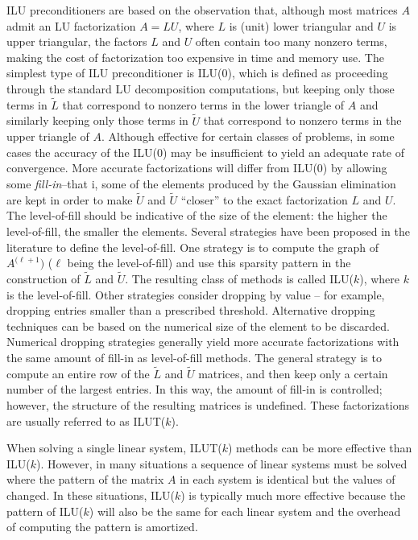 ILU preconditioners are based on the observation that, although most matrices
$A$ admit an LU factorization $A=LU$, where $L$ is (unit) lower triangular and
$U$ is upper triangular, the factors $L$ and $U$ often contain too many
nonzero terms, making the cost of factorization too expensive in time and
memory use.  The simplest type of ILU preconditioner is ILU(0), which is
defined as proceeding through the standard LU decomposition computations, but
keeping only those terms in $\tilde{L}$ that correspond to nonzero terms in
the lower triangle of $A$ and similarly keeping only those terms in
$\tilde{U}$ that correspond to nonzero terms in the upper triangle of $A$.
Although effective for certain classes of problems, in some cases the accuracy of the ILU(0) may be
insufficient to yield an adequate rate of convergence. More accurate
factorizations will differ from ILU(0) by allowing some {\em fill-in}--that i,
some of the elements produced by the Gaussian elimination are kept in order to
  make $\tilde{U}$ and $\tilde{U}$ ``closer'' to the exact factorization $L$
  and $U$.
The
level-of-fill should be indicative of the size of the element: the higher the
level-of-fill, the smaller the elements.  
Several strategies have been proposed in the literature to define the
level-of-fill. One strategy is to compute the graph of $A^{(\ell + 1})$
($\ell$ being the level-of-fill) and use this sparsity pattern in the
construction of $\tilde{L}$ and $\tilde{U}$.
The
resulting class of methods is called ILU($k$), where $k$ is the level-of-fill.
Other strategies consider dropping by value -- for example, dropping
entries smaller than a prescribed threshold. Alternative dropping
techniques can be based on the numerical size of the element to be
discarded. Numerical dropping strategies generally yield more accurate
factorizations with the same amount of fill-in as level-of-fill
methods. The general strategy is to compute an entire row of the
$\tilde{L}$ and $\tilde{U}$ matrices, and then keep only a certain
number of the largest
entries. In this way, the amount of fill-in is
controlled; however, the structure of the resulting matrices is
undefined. These factorizations are usually referred to as ILUT($k$).

When solving a single linear system, ILUT($k$) methods can be more effective
than ILU($k$).  However, in many situations a sequence of linear systems
must be solved where the pattern of the matrix $A$ in each system is
identical but the values of changed.  In these situations, ILU($k$) is 
typically much more effective because the pattern of ILU($k$) will also
be the same for each linear system and the overhead of computing the
pattern is amortized.


